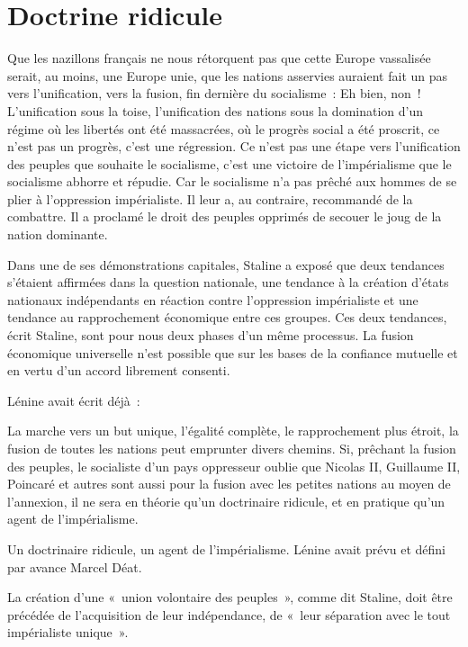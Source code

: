 \documentclass[french,twoside]{book} %
\newenvironment{quoteblock}%
  {\begin{quoting}}
  {\end{quoting}}
\newenvironment{quotebar}{%
    \def\FrameCommand{{\color{rubric!10!}\vrule width 0.5em} \hspace{0.9em}}%
    \def\OuterFrameSep{\itemsep} %
    \MakeFramed {\advance\hsize-\width \FrameRestore}
  }%
  {%
    \endMakeFramed
  }
\renewenvironment{quoteblock}%
  {%
    \savenotes
    \setstretch{0.9}
    \normalfont
    \begin{quotebar}
  }
  {%
    \end{quotebar}
    \spewnotes
  }
\begin{document}
\section[{Doctrine ridicule}]{Doctrine ridicule}
\noindent Que les nazillons français ne nous rétorquent pas que cette Europe vassalisée serait, au moins, une Europe unie, que les nations asservies auraient fait un pas vers l’unification, vers la fusion, fin dernière du socialisme : Eh bien, non ! L’unification sous la toise, l’unification des nations sous la domination d’un régime où les libertés ont été massacrées, où le progrès social a été proscrit, ce n’est pas un progrès, c’est une régression. Ce n’est pas une étape vers l’unification des peuples que souhaite le socialisme, c’est une victoire de l’impérialisme que le socialisme abhorre et répudie. Car le socialisme n’a pas prêché aux hommes de se plier à l’oppression impérialiste. Il leur a, au contraire, recommandé de la combattre. Il a proclamé le droit des peuples opprimés de secouer le joug de la nation dominante.\par
Dans une de ses démonstrations capitales, Staline a exposé que deux tendances s’étaient affirmées dans la question nationale, une tendance à la création d’états nationaux indépendants en réaction contre l’oppression impérialiste et une tendance au rapprochement économique entre ces groupes. Ces deux tendances, écrit Staline, sont pour nous deux phases d’un même processus. La fusion économique universelle n’est possible que sur les bases de la confiance mutuelle et en vertu d’un accord librement consenti.\par
Lénine avait écrit déjà :\par

\begin{quoteblock}
 \noindent La marche vers un but unique, l’égalité complète, le rapprochement plus étroit, la fusion de toutes les nations peut emprunter divers chemins. Si, prêchant la fusion des peuples, le socialiste d’un pays oppresseur oublie que Nicolas II, Guillaume II, Poincaré et autres sont aussi pour la fusion avec les petites nations au moyen de l’annexion, il ne sera en théorie qu’un doctrinaire ridicule, et en pratique qu’un agent de l’impérialisme.
 \end{quoteblock}

\noindent Un doctrinaire ridicule, un agent de l’impérialisme. Lénine avait prévu et défini par avance Marcel Déat.\par
La création d’une « union volontaire des peuples », comme dit Staline, doit être précédée de l’acquisition de leur indépendance, de « leur séparation avec le tout impérialiste unique ».
\end{document}
